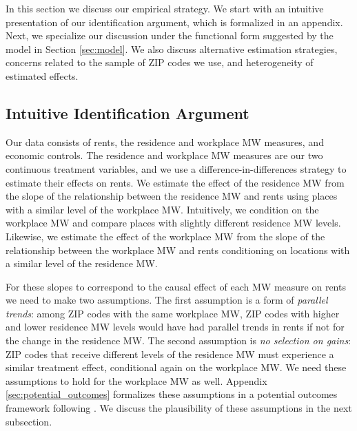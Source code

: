 
In this section we discuss our empirical strategy.
We start with an intuitive presentation of our identification argument, which
is formalized in an appendix.
Next, we specialize our discussion under the functional form suggested by
the model in Section \ref{sec:model}.
We also discuss alternative estimation strategies, concerns related to
the sample of ZIP codes we use, and heterogeneity of estimated effects.

\subsection{Intuitive Identification Argument}

Our data consists of rents, the residence and workplace MW measures, and 
economic controls.
The residence and workplace MW measures are our two continuous treatment 
variables, and we use a difference-in-differences strategy to estimate their 
effects on rents.
We estimate the effect of the residence MW from the slope of the relationship 
between the residence MW and rents using places with a similar level of the 
workplace MW.
Intuitively, we condition on the workplace MW and compare places with slightly
different residence MW levels.
Likewise, we estimate the effect of the workplace MW from the slope of the 
relationship between the workplace MW and rents conditioning on locations 
with a similar level of the residence MW.

For these slopes to correspond to the causal effect of each MW measure on rents 
we need to make two assumptions.
The first assumption is a form of \textit{parallel trends}: among ZIP codes with 
the same workplace MW, ZIP codes with higher and lower residence MW levels would 
have had parallel trends in rents if not for the change in the residence MW.
The second assumption is \textit{no selection on gains}: ZIP codes that receive
different levels of the residence MW must experience a similar treatment effect,
conditional again on the workplace MW.
We need these assumptions to hold for the workplace MW as well.
Appendix \ref{sec:potential_outcomes} formalizes these assumptions in a 
potential outcomes framework following \textcite{CallawayEtAl2021}.
We discuss the plausibility of these assumptions in the next subsection.

